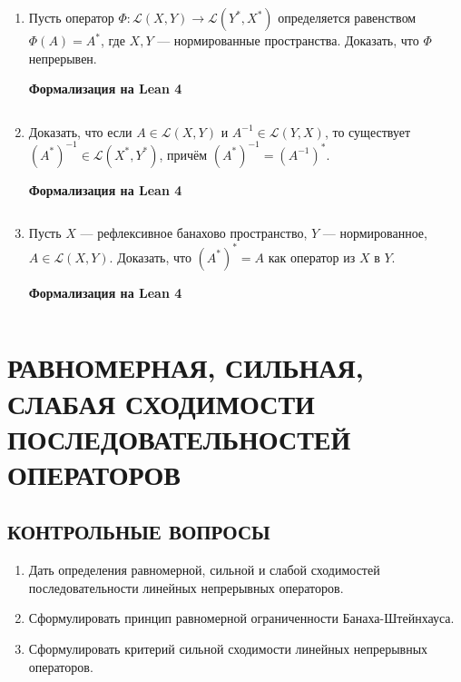 \documentclass[12pt,a4paper]{article}
\begin{document}
\begin{enumerate}
\newpage
\item Пусть оператор $\Phi: \mathcal{L}(X,Y) \rightarrow \mathcal{L}(Y^{*},X^{*})$ определяется равенством $\Phi(A) = A^{*}$, где $X, Y$ — нормированные пространства. Доказать, что $\Phi$ непрерывен.


\begin{center}\small\textbf{Формализация на Lean 4}\end{center}
\inputminted{lean}{FunAn/Section18_AdjointOperators/Task04.lean}

\newpage
\item Доказать, что если $A \in \mathcal{L}(X,Y)$ и $A^{-1} \in \mathcal{L}(Y,X)$, то существует $(A^{*})^{-1} \in \mathcal{L}(X^{*},Y^{*})$, причём $(A^{*})^{-1} = (A^{-1})^{*}$.


\begin{center}\small\textbf{Формализация на Lean 4}\end{center}
\inputminted{lean}{FunAn/Section18_AdjointOperators/Task05.lean}

\newpage
\item Пусть $X$ — рефлексивное банахово пространство, $Y$ — нормированное, $A \in \mathcal{L}(X,Y)$. Доказать, что $(A^{*})^{*} = A$ как оператор из $X$ в $Y$.

\begin{center}\small\textbf{Формализация на Lean 4}\end{center}
\inputminted{lean}{FunAn/Section18_AdjointOperators/Task06.lean}

\end{enumerate}

\section{РАВНОМЕРНАЯ, СИЛЬНАЯ, СЛАБАЯ СХОДИМОСТИ ПОСЛЕДОВАТЕЛЬНОСТЕЙ ОПЕРАТОРОВ}

\subsection*{КОНТРОЛЬНЫЕ ВОПРОСЫ}
\begin{enumerate}
\item Дать определения равномерной, сильной и слабой сходимостей последовательности линейных непрерывных операторов.
\item Сформулировать принцип равномерной ограниченности Банаха-Штейнхауса.
\item Сформулировать критерий сильной сходимости линейных непрерывных операторов.
\end{enumerate}
\end{document}
